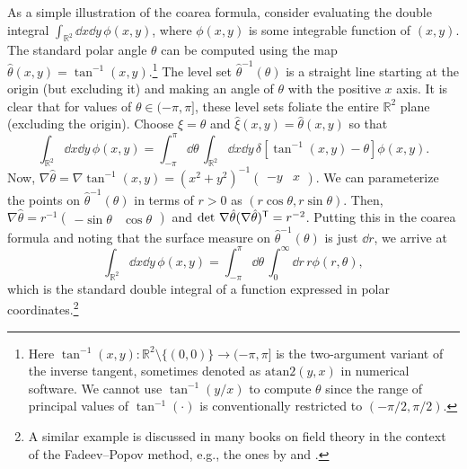 \begin{example}
  As a simple illustration of the coarea formula, consider evaluating the double integral $\int_{\mathbb{R}^{2}} \dd{x}\dd{y}\, \phi(x,y)$, where $\phi(x, y)$ is some integrable function of $(x, y)$.
  The standard polar angle $\theta$ can be computed using the map $\hat{\theta}(x, y) = \tan^{-1}(x, y)$.\footnote{Here $\tan^{-1}(x, y): \mathbb{R}^{2} \setminus \{(0,0)\} \to (-\pi, \pi]$ is the two-argument variant of the inverse tangent, sometimes denoted as $\mathrm{atan2}(y, x)$ in numerical software.  We cannot use $\tan^{-1}(y/x)$ to compute $\theta$ since the range of principal values of $\tan^{-1}(\cdot)$ is conventionally restricted to $(-\pi/2, \pi/2)$.}
  The level set $\hat{\theta}^{-1}(\theta)$ is a straight line starting at the origin (but excluding it) and making an angle of $\theta$ with the positive $x$ axis.
  It is clear that for values of $\theta \in (-\pi, \pi]$, these level sets foliate the entire $\mathbb{R}^{2}$ plane (excluding the origin).
  Choose $\xi = \theta$ and $\hat{\xi}(x, y) = \hat{\theta}(x, y)$ so that
  \begin{equation}
    \int_{\mathbb{R}^{2}} \dd{x}\dd{y}\, \phi(x, y) = \int_{-\pi}^{\pi} \dd\theta\, \int_{\mathbb{R}^{2}} \dd{x}\dd{y}\, \delta[\tan^{-1}(x, y) - \theta] \phi(x, y).
  \end{equation}
  Now, $\nabla\hat{\theta} = \nabla\tan^{-1}(x, y) = (x^{2} + y^{2})^{-1}\begin{pmatrix}-y & x\end{pmatrix}$.
  We can parameterize the points on $\hat{\theta}^{-1}(\theta)$ in terms of $r > 0$ as $(r\cos{\theta}, r\sin{\theta})$.
  Then, $\nabla\hat{\theta} = r^{-1}\begin{pmatrix}-\sin\theta & \cos\theta\end{pmatrix}$ and $\det\,\nabla\hat{\theta}(\nabla\hat{\theta})^\mathsf{T} = r^{-2}$.
  Putting this in the coarea formula and noting that the surface measure on $\hat{\theta}^{-1}(\theta)$ is just $\dd{r}$, we arrive at
  \begin{equation}
    \int_{\mathbb{R}^{2}} \dd{x}\dd{y}\, \phi(x, y) = \int_{-\pi}^{\pi} \dd\theta\, \int_0^{\infty} \dd{r}\, r \phi(r, \theta),
  \end{equation}
  which is the standard double integral of a function expressed in polar coordinates.\footnote{A similar example is discussed in many books on field theory in the context of the Fadeev--Popov method, e.g., the ones by \citet[Section 7.2]{ryder1996} and \citet[Part III.4]{zee2010}.}
\end{example}

